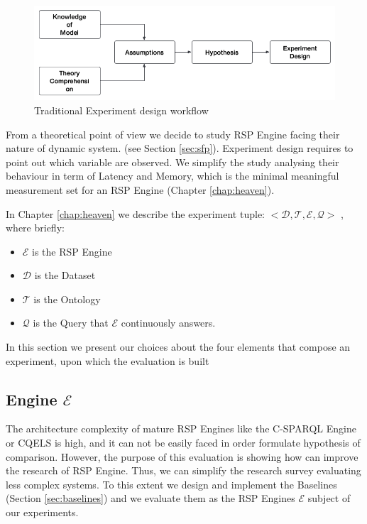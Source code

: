 \begin{figure}[tbh]
  \centering
	\includegraphics[width=\linewidth]{images/experiment-design}
	\caption{Traditional Experiment design workflow} 
  	\label{fig:experiment-design}
\end{figure}

From a theoretical point of view we decide to study RSP Engine facing their nature of dynamic system. (see Section \ref{sec:sfp}). Experiment design requires to point out which variable are observed. We simplify the study analysing their behaviour in term of Latency and Memory, which is the minimal meaningful measurement set for an RSP Engine (Chapter \ref{chap:heaven}).

In Chapter \ref{chap:heaven} we describe the experiment tuple: $<\mathcal{D}, \mathcal{T},\mathcal{E}, \mathcal{Q}>$ , where briefly:
\begin{itemize}
\item $\mathcal{E}$ is the RSP Engine
\item $\mathcal{D}$ is the Dataset 
\item $\mathcal{T}$ is the Ontology
\item $\mathcal{Q}$ is the Query that $\mathcal{E}$ continuously answers.
\end{itemize}

In this section we present our choices about the four elements that compose an experiment, upon which the evaluation is built

\subsection{Engine $\mathcal{E}$}

The architecture complexity of mature RSP Engines like the C-SPARQL Engine or CQELS is high, and it can not be easily faced in order formulate hypothesis of comparison. However, the purpose of this evaluation is showing how \name can improve the research of RSP Engine. Thus, we can simplify the research survey evaluating less complex systems. To this extent we design and implement the Baselines (Section \ref{sec:baselines}) and we evaluate them as the RSP Engines $\mathcal{E}$ subject of our experiments. 

